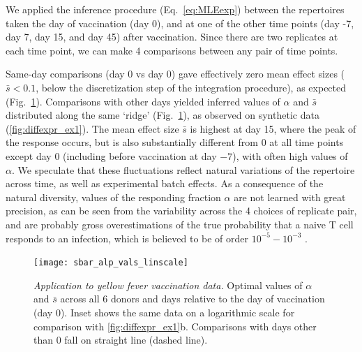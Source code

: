 We applied the inference procedure (Eq.~\ref{eq:MLEexp}) between the repertoires taken the day of vaccination (day 0), and at one of the other time points (day -7, day 7, day 15, and day 45) after vaccination. Since there are two replicates at each time point, we can make 4 comparisons between any pair of time points.

Same-day comparisons (day 0 vs day 0) gave effectively zero mean effect sizes ($\bar s<0.1$, below the discretization step of the integration procedure), as expected (Fig.~\ref{fig:diffexpr_ex2}). Comparisons with other days yielded inferred values of $\alpha$ and $\bar s$ distributed along the same  `ridge' (Fig.~\ref{fig:diffexpr_ex2}), as observed on synthetic data (\cref{fig:diffexpr_ex1}). The mean effect size $\bar s$ is highest at day 15, where the peak of the response occurs, but is also substantially different from 0 at all time points except day 0 (including before vaccination at day $-7$), with often high values of $\alpha$. We speculate that these fluctuations reflect natural variations of the repertoire across time, as well as experimental batch effects. As a consequence of the natural diversity, 
values of the responding fraction $\alpha$ are not learned with great precision, as can be seen from the variability across the 4 choices of replicate pair, and are probably gross overestimations of the true probability that a naive T cell responds to an infection, which is believed to be of order $10^{-5}-10^{-3}$ \cite{Boer1993}.


\begin{figure}
\texttt{[image: sbar\_alp\_vals\_linscale]}
\centering{}
\caption{
\emph{Application to yellow fever vaccination data.} Optimal values of $\alpha$ and $\bar{s}$ across all 6 donors and days relative to the day of vaccination (day 0). Inset shows the same data on a logarithmic scale for comparison with \cref{fig:diffexpr_ex1}b. Comparisons with days other than 0 fall on straight line (dashed line).
\label{fig:diffexpr_ex2}
}
\end{figure}
